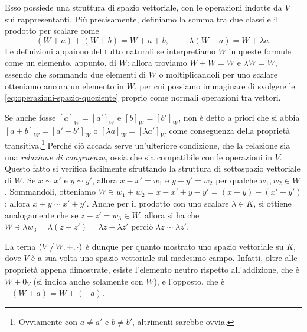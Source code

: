 Esso possiede una struttura di spazio vettoriale, con le operazioni indotte da $V$ sui rappresentanti.
Più precisamente, definiamo la somma tra due classi e il prodotto per scalare come
\begin{equation}
	(W+a)+(W+b)=W+a+b,\hspace{1cm}\lambda(W+a)=W+\lambda a.
	\label{eq:operazioni-spazio-quoziente}
\end{equation}
Le definizioni appaiono del tutto naturali se interpretiamo $W$ in queste formule come un elemento, appunto, di $W$: allora troviamo $W+W=W$ e $\lambda W=W$, essendo che sommando due elementi di $W$ o moltiplicandoli per uno scalare otteniamo ancora un elemento in $W$, per cui possiamo immaginare di svolgere le \eqref{eq:operazioni-spazio-quoziente} proprio come normali operazioni tra vettori.

\begin{osservazione} \label{o:spazio-quoziente-congruenza}
	Se anche fosse $[a]_W=[a']_W$ e $[b]_W=[b']_W$, non è detto a priori che si abbia $[a+b]_W=[a'+b']_W$ o $[\lambda a]_W=[\lambda a']_W$ come conseguenza della proprietà transitiva.\footnote{Ovviamente con $a\ne a'$ e $b\ne b'$, altrimenti sarebbe ovvia.}
	Perché ciò accada serve un'ulteriore condizione, che la relazione sia una \emph{relazione di congruenza}, ossia che sia compatibile con le operazioni in $V$.
	Questo fatto si verifica facilmente sfruttando la struttura di sottospazio vettoriale di $W$.
	Se $x\sim x'$ e $y\sim y'$, allora $x-x'=w_1$ e $y-y'=w_2$ per qualche $w_1,w_2\in W$.
	Sommandoli, otteniamo $W\ni w_1+w_2=x-x'+y-y'=(x+y)-(x'+y')$: allora $x+y\sim x'+y'$.
	Anche per il prodotto con uno scalare $\lambda\in K$, si ottiene analogamente che se $z-z'=w_3\in W$, allora si ha che $W\ni\lambda w_3=\lambda(z-z')=\lambda z-\lambda z'$ perciò $\lambda z\sim \lambda z'$.
\end{osservazione}

La terna $(V\,/\, W,+,\cdot)$ è dunque per quanto mostrato uno spazio vettoriale su $K$, dove $V$ è a sua volta uno spazio vettoriale sul medesimo campo.
Infatti, oltre alle proprietà appena dimostrate, esiste l'elemento neutro rispetto all'addizione, che è $W+0_V$ (si indica anche solamente con $W$), e l'opposto, che è $-(W+a)=W+(-a)$.

